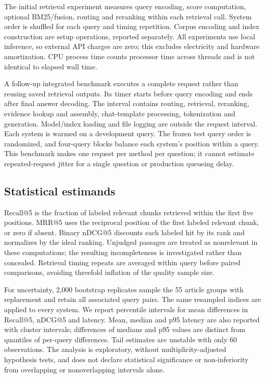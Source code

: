 \documentclass[10pt,a4paper]{article}
\begin{document}
The initial retrieval experiment measures query encoding, score
computation, optional BM25/fusion, routing and reranking within each
retrieval call. System order is shuffled for each query and timing
repetition. Corpus encoding and index construction are setup operations,
reported separately. All experiments use local inference, so external
API charges are zero; this excludes electricity and hardware
amortization. CPU process time counts processor time across threads and
is not identical to elapsed wall time.

A follow-up integrated benchmark executes a complete request rather than
reusing saved retrieval outputs. Its timer starts before query encoding
and ends after final answer decoding. The interval contains routing,
retrieval, reranking, evidence lookup and assembly, chat-template
processing, tokenization and generation. Model/index loading and file
logging are outside the request interval. Each system is warmed on a
development query. The frozen test query order is randomized, and
four-query blocks balance each system's position within a query. This
benchmark makes one request per method per question; it cannot estimate
repeated-request jitter for a single question or production queueing
delay.

\hypertarget{statistical-estimands}{%
\subsection{Statistical estimands}\label{statistical-estimands}}

Recall@5 is the fraction of labeled relevant chunks retrieved within the
first five positions. MRR@5 uses the reciprocal position of the first
labeled relevant chunk, or zero if absent. Binary nDCG@5 discounts each
labeled hit by its rank and normalizes by the ideal ranking. Unjudged
passages are treated as nonrelevant in these computations; the resulting
incompleteness is investigated rather than concealed. Retrieval timing
repeats are averaged within query before paired comparisons, avoiding
threefold inflation of the quality sample size.

For uncertainty, 2,000 bootstrap replicates sample the 55 article groups
with replacement and retain all associated query pairs. The same
resampled indices are applied to every system. We report percentile
intervals for mean differences in Recall@5, nDCG@5 and latency. Mean,
median and p95 latency are also reported with cluster intervals;
differences of medians and p95 values are distinct from quantiles of
per-query differences. Tail estimates are unstable with only 60
observations. The analysis is exploratory, without multiplicity-adjusted
hypothesis tests, and does not declare statistical significance or
non-inferiority from overlapping or nonoverlapping intervals alone.
\end{document}
